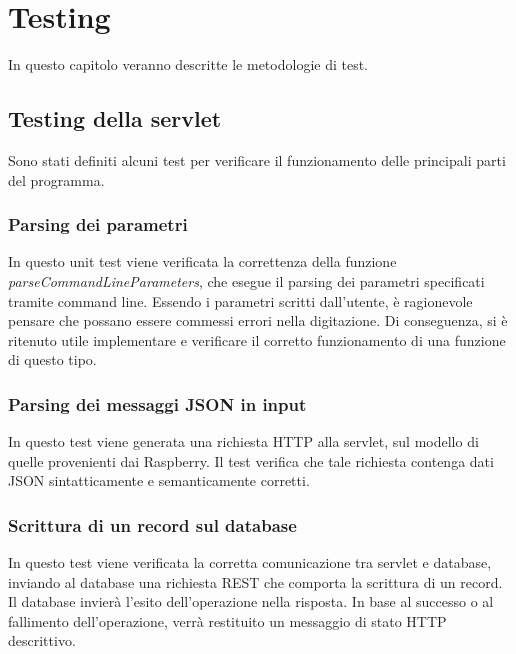 \chapter{Testing}

In questo capitolo veranno descritte le metodologie di test.

\section{Testing della servlet}
Sono stati definiti alcuni test per verificare il funzionamento delle principali parti del programma.

\subsection{Parsing dei parametri}
In questo unit test viene verificata la correttenza della funzione \textit{parseCommandLineParameters}, che esegue il parsing dei parametri specificati tramite command line.
Essendo i parametri scritti dall'utente, è ragionevole pensare che possano essere commessi errori nella digitazione.
Di conseguenza, si è ritenuto utile implementare e verificare il corretto funzionamento di una funzione di questo tipo.

\subsection{Parsing dei messaggi JSON in input}
In questo test viene generata una richiesta HTTP alla servlet, sul modello di quelle provenienti dai Raspberry. Il test verifica che tale richiesta contenga dati JSON sintatticamente e semanticamente corretti.

\subsection{Scrittura di un record sul database}
In questo test viene verificata la corretta comunicazione tra servlet e database, inviando al database una richiesta REST che comporta la scrittura di un record.
Il database invierà l'esito dell'operazione nella risposta. In base al successo o al fallimento dell'operazione, verrà restituito un messaggio di stato HTTP descrittivo.

